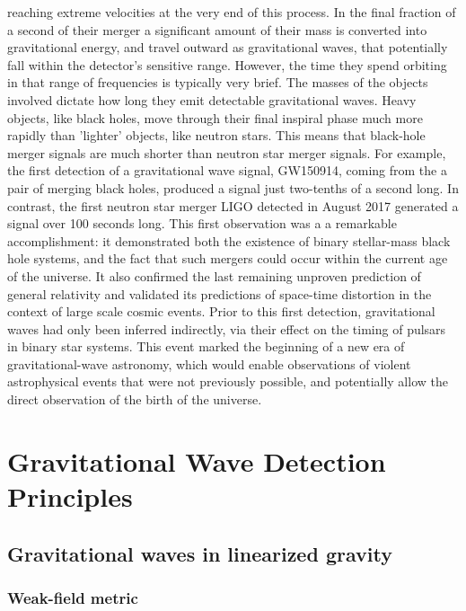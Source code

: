 \documentclass[binding=0.6cm, LaM]{sapthesis}
\begin{document}
	reaching extreme velocities at the very end of this process. 
	In the final fraction of a second of their merger a significant amount of their mass is converted into gravitational energy, 
	and travel outward as gravitational waves, that potentially fall within the detector’s sensitive range. 
	However, the time they spend orbiting in that range of frequencies is typically very brief.
        The masses of the objects involved dictate how long they emit detectable gravitational waves. 
        Heavy objects, like black holes, move through their final inspiral phase much more rapidly than 'lighter' objects, 
        like neutron stars. This means that black-hole merger signals are much shorter than neutron star merger signals.
        For example, the first detection of a gravitational wave signal, GW150914, coming from the a pair of merging black holes, 
	produced a signal just two-tenths of a second long. 
        In contrast, the first neutron star merger LIGO detected in August 2017 generated a signal over 100 seconds long.
	This first observation was a a remarkable accomplishment: it demonstrated both the existence of binary stellar-mass black hole systems, 
	and the fact that such mergers could occur within the current age of the universe.  
	It also confirmed the last remaining unproven prediction of general relativity and validated 
	its predictions of space-time distortion in the context of large scale cosmic events. 
	Prior to this first detection, gravitational waves had only been inferred indirectly,
        via their effect on the timing of pulsars in binary star systems.
	This event  marked the beginning of a new era of gravitational-wave astronomy, 
	which would enable observations of violent astrophysical events that were not previously possible, 
	and potentially allow the direct observation of the birth of the universe.


\chapter{Gravitational Wave Detection Principles}
\section{Gravitational waves in linearized gravity}

\subsection{Weak-field metric}
\end{document}
